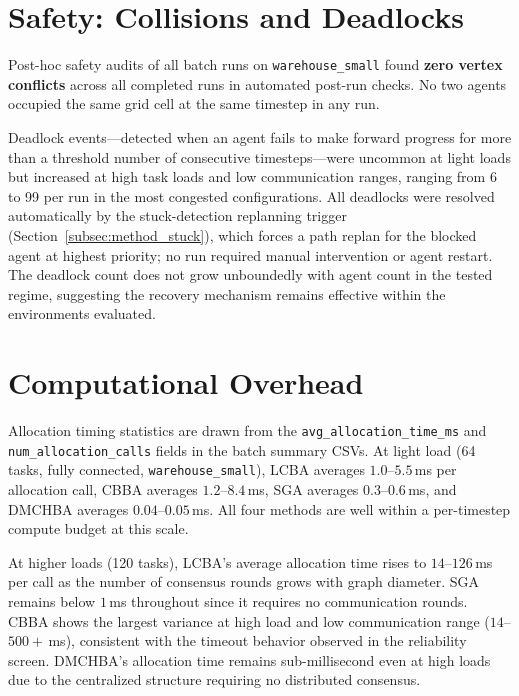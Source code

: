 \section{Safety: Collisions and Deadlocks}
\label{sec:exp_safety}

Post-hoc safety audits of all batch runs on \texttt{warehouse\_small}
found \textbf{zero vertex conflicts} across all completed runs in automated
post-run checks.
No two agents occupied the same grid cell at the same timestep in any run.

Deadlock events---detected when an agent fails to make forward progress
for more than a threshold number of consecutive timesteps---were
uncommon at light loads but increased at high task loads and low
communication ranges, ranging from 6 to 99 per run in the most congested
configurations.
All deadlocks were resolved automatically by the stuck-detection replanning
trigger (Section~\ref{subsec:method_stuck}), which forces a path replan for
the blocked agent at highest priority; no run required manual intervention
or agent restart.
The deadlock count does not grow unboundedly with agent count in the
tested regime, suggesting the recovery mechanism remains effective
within the environments evaluated.


\section{Computational Overhead}
\label{sec:exp_timing}

Allocation timing statistics are drawn from the \texttt{avg\_allocation\_time\_ms} and \\ \texttt{num\_allocation\_calls} fields in the batch summary CSVs.
At light load (64 tasks, fully connected, \texttt{warehouse\_small}),
LCBA averages $1.0$--$5.5$\,ms per allocation call,
CBBA averages $1.2$--$8.4$\,ms, SGA averages $0.3$--$0.6$\,ms, and
DMCHBA averages $0.04$--$0.05$\,ms.
All four methods are well within a per-timestep compute budget at this scale.

At higher loads (120 tasks), LCBA's average allocation time rises to
$14$--$126$\,ms per call as the number of consensus rounds grows with
graph diameter.
SGA remains below $1$\,ms throughout since it requires no communication
rounds.
CBBA shows the largest variance at high load and low communication range
($14$--$500+$\,ms), consistent with the timeout behavior observed in the
reliability screen.
DMCHBA's allocation time remains sub-millisecond even at high loads due to
the centralized structure requiring no distributed consensus.

